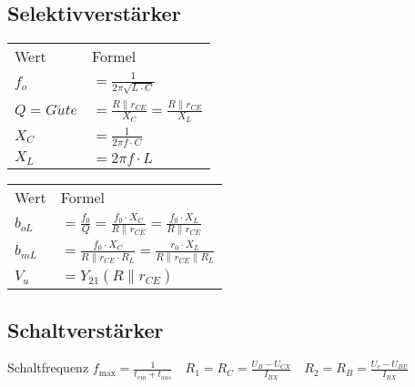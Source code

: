 \subsection{Selektivverstärker} %
    \begin{minipage}{0.45\columnwidth}
        \renewcommand{\arraystretch}{1.05}
        \begin{table}[H]
            \begin{tabularx}{\columnwidth}{l l}
                Wert            & Formel \\
                $f_o$           & $=\frac{1}{2\pi\sqrt{L\cdot C}}$ \\
                $Q=G\ddot{u}te$ & $=\frac{R\parallel r_{CE}}{X_C}=\frac{R\parallel r_{CE}}{X_L}$ \\
                $X_C$           & $=\frac{1}{2\pi f\cdot C}$ \\
                $X_L$           & $=2\pi f\cdot L$ \\
            \end{tabularx}
        \end{table}
    \end{minipage}
    \begin{minipage}{0.45\columnwidth}
        \renewcommand{\arraystretch}{1.05}
        \begin{table}[H]
            \begin{tabularx}{\columnwidth}{l l}
                Wert        & Formel \\
                $b_{oL}$    & $=\frac{f_0}{Q}=\frac{f_0\cdot X_C}{R\parallel r_{CE}}=\frac{f_0\cdot X_L}{R\parallel r_{CE}}$ \\
                $b_{mL}$    & $=\frac{f_0\cdot X_C}{R\parallel r_{CE}\cdot R_L}=\frac{r_0\cdot X_L}{R\parallel r_{CE}\parallel R_L}$ \\
                $V_u$       & $=Y_{21}(R\parallel r_{CE})$ \\
            \end{tabularx}
        \end{table}
    \end{minipage}
\subsection{Schaltverstärker}
    Schaltfrequenz $f_{\max}=\frac{1}{t_{ein}+t_{aus}}\quad R_1=R_C=\frac{U_B-U_{CX}}{I_{BX}}\quad R_2=R_B=\frac{U_e-U_{BE}}{I_{BX}}$
